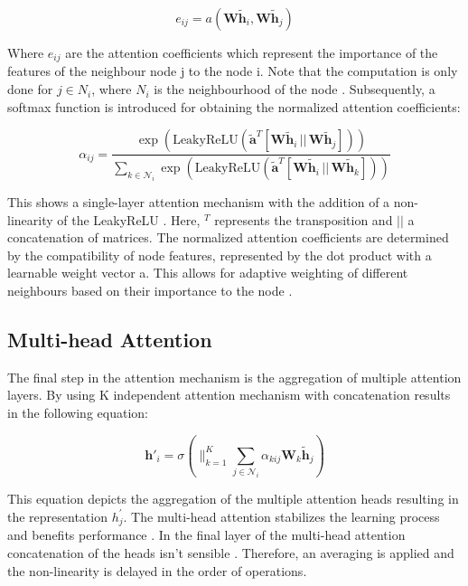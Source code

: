 \documentclass[runningheads]{llncs}
\begin{document}
\begin{equation}
    e_{ij} = a(\mathbf{W}\mathbf{\tilde{h}}_i, \mathbf{W}\mathbf{\tilde{h}}_j)
\end{equation}

Where $e_{ij}$ are the attention coefficients which represent the importance of the features of the neighbour node j to the node i. Note that the computation is only done for $ j \in N_{i}$, where $N_{i}$ is the neighbourhood of the node \cite{veličković2018graph}. Subsequently, a softmax function is introduced for obtaining the normalized attention coefficients:

\begin{equation}
    \alpha_{ij} = \frac{\exp(\text{LeakyReLU}(\mathbf{\tilde{a}}^T [\mathbf{W}\mathbf{\tilde{h}}_i \,||\, \mathbf{W}\mathbf{\tilde{h}}_j]))}{\sum_{k \in \mathcal{N}_i} \exp(\text{LeakyReLU}(\mathbf{\tilde{a}}^T [\mathbf{W}\mathbf{\tilde{h}}_i \,||\, \mathbf{W}\mathbf{\tilde{h}}_k]))}
\end{equation}

This shows a single-layer attention mechanism with the addition of a non-linearity of the LeakyReLU \cite{veličković2018graph}. 
Here, $^T$ represents the transposition and $||$ a concatenation of matrices. The normalized attention coefficients are 
determined by the compatibility of node features, represented by the dot product with a learnable weight vector a. This allows for adaptive weighting of different neighbours based on their importance to the node \cite{veličković2018graph}.

\subsection{Multi-head Attention}
The final step in the attention mechanism is the aggregation of multiple attention layers. By using K independent attention mechanism with concatenation results in the following equation:

\begin{equation}
    \mathbf{h}'_i = \sigma\left( \big\|_{k=1}^{K} \sum_{j \in \mathcal{N}_i} \alpha_{kij} \mathbf{W}_k \mathbf{\tilde{h}}_j \right)
\end{equation}

This equation depicts the aggregation of the multiple attention heads resulting in the representation $h^{'}_{j}$. The multi-head attention stabilizes the learning process and benefits performance \cite{Vaswani2017}. In the final layer of the multi-head attention concatenation of the heads isn't sensible \cite{Vaswani2017} \cite{Brody2021}. Therefore, an averaging is applied and the non-linearity is delayed in the order of operations.
\end{document}
